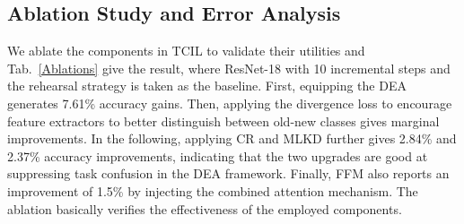 \documentclass[letterpaper]{article} \usepackage{aaai23}  \usepackage{times}  \usepackage{helvet}  \usepackage{courier}  \usepackage[hyphens]{url}  \usepackage{graphicx} \urlstyle{rm} \def\UrlFont{\rm}  \usepackage{natbib}  \usepackage{caption} \frenchspacing  \setlength{\pdfpagewidth}{8.5in}  \setlength{\pdfpageheight}{11in}  \usepackage{algorithm}
\begin{document}
 \begin{table}
    \centering
    \caption{Ablations on the components of TCIL}
    \label{Ablations}
\end{table}

\subsection{Ablation Study and Error Analysis}
We ablate the components in TCIL to validate their utilities and Tab.~\ref{Ablations} give the result, where ResNet-18 with 10 incremental steps and the rehearsal strategy is taken as the baseline. First, equipping the DEA generates 7.61\% accuracy gains. Then, applying the divergence loss to encourage feature extractors to better distinguish between old-new classes gives marginal improvements. In the following, applying CR and MLKD further gives 2.84\% and 2.37\% accuracy improvements, indicating that the two upgrades are good at suppressing task confusion in the DEA framework. Finally, FFM also reports an improvement of 1.5\% by injecting the combined attention mechanism. The ablation basically verifies the effectiveness of the employed components.
\end{document}
